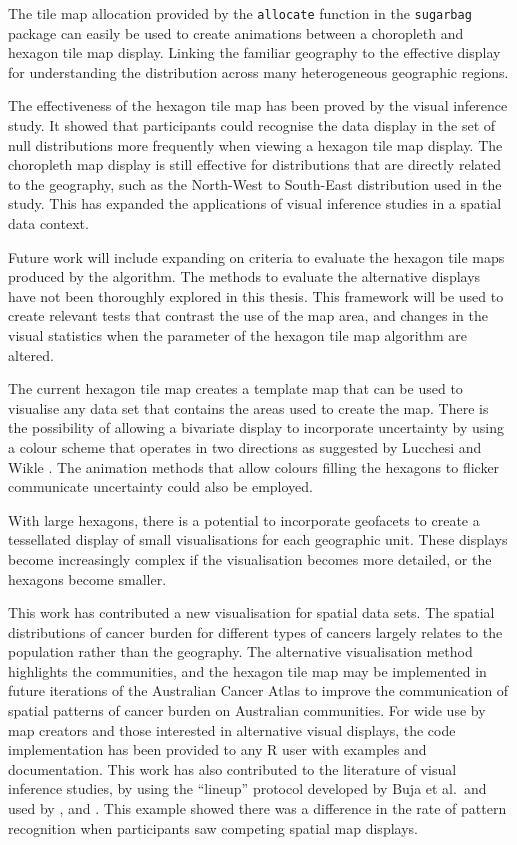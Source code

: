 \documentclass{monashthesis}
\begin{document}
The tile map allocation provided by the \texttt{allocate} function in the \texttt{sugarbag} package can easily be used to create animations between a choropleth and hexagon tile map display. Linking the familiar geography to the effective display for understanding the distribution across many heterogeneous geographic regions.

The effectiveness of the hexagon tile map has been proved by the visual inference study. It showed that participants could recognise the data display in the set of null distributions more frequently when viewing a hexagon tile map display. The choropleth map display is still effective for distributions that are directly related to the geography, such as the North-West to South-East distribution used in the study.
This has expanded the applications of visual inference studies in a spatial data context.

Future work will include expanding on criteria to evaluate the hexagon tile maps produced by the algorithm. The methods to evaluate the alternative displays have not been thoroughly explored in this thesis.
This framework will be used to create relevant tests that contrast the use of the map area, and changes in the visual statistics when the parameter of the hexagon tile map algorithm are altered.

The current hexagon tile map creates a template map that can be used to visualise any data set that contains the areas used to create the map.
There is the possibility of allowing a bivariate display to incorporate uncertainty by using a colour scheme that operates in two directions as suggested by Lucchesi and Wikle \autocite{VUADBC}.
The animation methods that allow colours filling the hexagons to flicker communicate uncertainty could also be employed.

With large hexagons, there is a potential to incorporate geofacets \autocite{IGF} to create a tessellated display of small visualisations for each geographic unit. These displays become increasingly complex if the visualisation becomes more detailed, or the hexagons become smaller.

This work has contributed a new visualisation for spatial data sets. The spatial distributions of cancer burden for different types of cancers largely relates to the population rather than the geography. The alternative visualisation method highlights the communities, and the hexagon tile map may be implemented in future iterations of the Australian Cancer Atlas to improve the communication of spatial patterns of cancer burden on Australian communities. For wide use by map creators and those interested in alternative visual displays, the code implementation has been provided to any R user with examples and documentation.
This work has also contributed to the literature of visual inference studies, by using the ``lineup'' protocol developed by Buja et al.~and used by \textcite{GIIV}, and \textcite{GTPCCD}. This example showed there was a difference in the rate of pattern recognition when participants saw competing spatial map displays.
\end{document}
